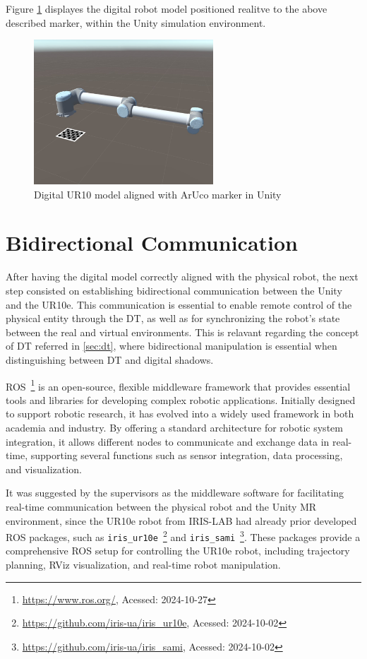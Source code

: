 Figure \ref{f:ur10_marker_unity} displayes the digital robot model positioned realitve to the above described marker, within the Unity simulation environment.

\begin{figure}[h]
    \centering
    \includegraphics[width=0.6\textwidth]{figs/robot_marker_unity.jpg}
    \caption{Digital UR10 model aligned with ArUco marker in Unity}
    \label{f:ur10_marker_unity}
\end{figure}

\section{Bidirectional Communication}

After having the digital model correctly aligned with the physical robot, the next step consisted on establishing bidirectional communication between the Unity and the UR10e. This communication is essential to enable remote control of the physical entity through the \ac{DT}, as well as for synchronizing the robot's state between the real and virtual environments. This is relavant regarding the concept of \ac{DT} referred in \ref{sec:dt}, where bidirectional manipulation is essential when distinguishing between \ac{DT} and digital shadows. 

\ac{ROS}~\footnote{\url{https://www.ros.org/}, Acessed: 2024-10-27} is an open-source, flexible middleware framework that provides essential tools and libraries for developing complex robotic applications. Initially designed to support robotic research, it has evolved into a widely used framework in both academia and industry. By offering a standard architecture for robotic system integration, it allows different nodes to communicate and exchange data in real-time, supporting several functions such as sensor integration, data processing, and visualization.

It was suggested by the supervisors as the middleware software for facilitating real-time communication between the physical robot and the Unity \ac{MR} environment, since the UR10e robot from IRIS-LAB had already prior developed \ac{ROS} packages, such as \texttt{iris\_ur10e}~\footnote{\url{https://github.com/iris-ua/iris_ur10e}, Acessed: 2024-10-02} and \texttt{iris\_sami}~\footnote{\url{https://github.com/iris-ua/iris_sami}, Acessed: 2024-10-02}. These packages provide a comprehensive \ac{ROS} setup for controlling the UR10e robot, including trajectory planning, RViz visualization, and real-time robot manipulation. 
